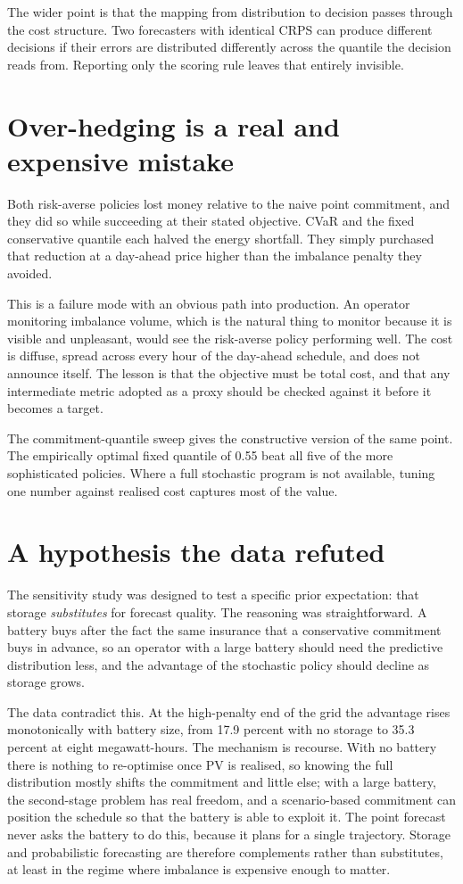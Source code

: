 \documentclass[11pt,a4paper,oneside]{report}
\begin{document}
The wider point is that the mapping from distribution to decision passes through the cost structure. Two forecasters with identical CRPS can produce different decisions if their errors are distributed differently across the quantile the decision reads from. Reporting only the scoring rule leaves that entirely invisible.

\section{Over-hedging is a real and expensive mistake}

Both risk-averse policies lost money relative to the naive point commitment, and they did so while succeeding at their stated objective. CVaR and the fixed conservative quantile each halved the energy shortfall. They simply purchased that reduction at a day-ahead price higher than the imbalance penalty they avoided.

This is a failure mode with an obvious path into production. An operator monitoring imbalance volume, which is the natural thing to monitor because it is visible and unpleasant, would see the risk-averse policy performing well. The cost is diffuse, spread across every hour of the day-ahead schedule, and does not announce itself. The lesson is that the objective must be total cost, and that any intermediate metric adopted as a proxy should be checked against it before it becomes a target.

The commitment-quantile sweep gives the constructive version of the same point. The empirically optimal fixed quantile of 0.55 beat all five of the more sophisticated policies. Where a full stochastic program is not available, tuning one number against realised cost captures most of the value.

\section{A hypothesis the data refuted}

The sensitivity study was designed to test a specific prior expectation: that storage \emph{substitutes} for forecast quality. The reasoning was straightforward. A battery buys after the fact the same insurance that a conservative commitment buys in advance, so an operator with a large battery should need the predictive distribution less, and the advantage of the stochastic policy should decline as storage grows.

The data contradict this. At the high-penalty end of the grid the advantage rises monotonically with battery size, from 17.9 percent with no storage to 35.3 percent at eight megawatt-hours. The mechanism is recourse. With no battery there is nothing to re-optimise once PV is realised, so knowing the full distribution mostly shifts the commitment and little else; with a large battery, the second-stage problem has real freedom, and a scenario-based commitment can position the schedule so that the battery is able to exploit it. The point forecast never asks the battery to do this, because it plans for a single trajectory. Storage and probabilistic forecasting are therefore complements rather than substitutes, at least in the regime where imbalance is expensive enough to matter.
\end{document}
